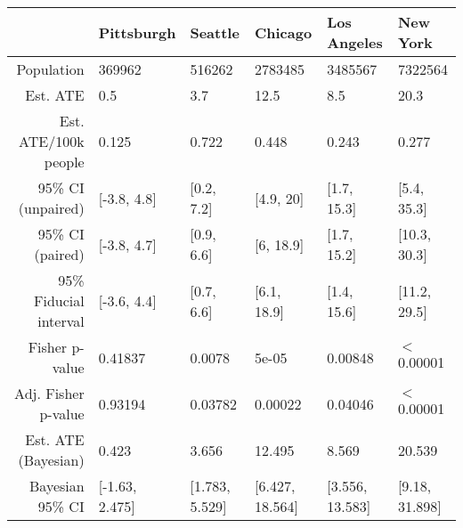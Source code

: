 \begin{table}[ht]
\centering
\begin{tabular}{rlllll}
  \hline
 & Pittsburgh & Seattle & Chicago & Los Angeles & New York \\ 
  \hline
Population &  369962 &  516262 & 2783485 & 3485567 & 7322564 \\ 
  Est. ATE &  0.5 &  3.7 & 12.5 &  8.5 & 20.3 \\ 
  Est. ATE/100k people & 0.125 & 0.722 & 0.448 & 0.243 & 0.277 \\ 
  95\% CI (unpaired) & [-3.8, 4.8] & [0.2, 7.2] & [4.9, 20] & [1.7, 15.3] & [5.4, 35.3] \\ 
  95\% CI (paired) & [-3.8, 4.7] & [0.9, 6.6] & [6, 18.9] & [1.7, 15.2] & [10.3, 30.3] \\ 
  95\% Fiducial interval & [-3.6, 4.4] & [0.7, 6.6] & [6.1, 18.9] & [1.4, 15.6] & [11.2, 29.5] \\ 
  Fisher p-value & 0.41837 & 0.0078 & 5e-05 & 0.00848 & $<$0.00001 \\ 
  Adj. Fisher p-value & 0.93194 & 0.03782 & 0.00022 & 0.04046 & $<$0.00001 \\ 
  Est. ATE (Bayesian) &  0.423 &  3.656 & 12.495 &  8.569 & 20.539 \\ 
  Bayesian 95\% CI & [-1.63, 2.475] & [1.783, 5.529] & [6.427, 18.564] & [3.556, 13.583] & [9.18, 31.898] \\ 
   \hline
\end{tabular}
\end{table}
